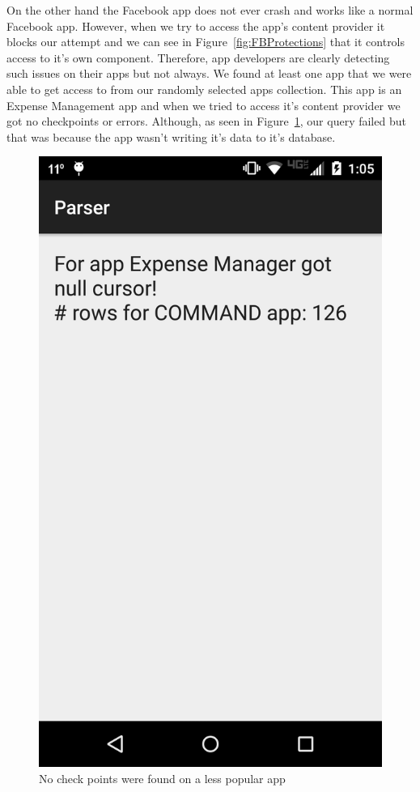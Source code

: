 On the other hand the Facebook app does not ever crash and works like a normal Facebook app. However, when we try to access the app's content provider it blocks our attempt and we can see in Figure~\ref{fig:FBProtections} that it controls access to it's own component. Therefore, app developers are clearly detecting such issues on their apps but not always. We found at least one app that we were able to get access to from our randomly selected apps collection. This app is an Expense Management app and when we tried to access it's content provider we got no checkpoints or errors. Although, as seen in Figure~\ref{fig:nochecks}, our query failed but that was because the app wasn't writing it's data to it's database.

\begin{figure}[tb]
\centering
	\includegraphics[scale=0.18]{images/nochecks}
	\caption{No check points were found on a less popular app}
	\label{fig:nochecks}
\end{figure}

